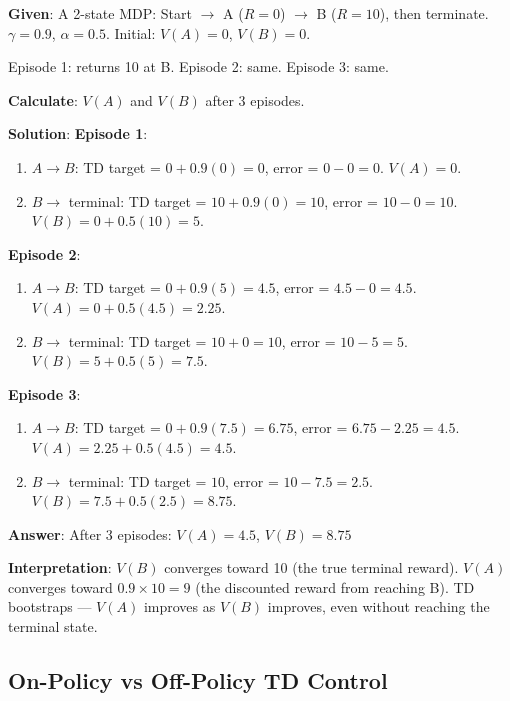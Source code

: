 \documentclass[11pt,a4paper]{article}
\begin{document}
\begin{tcolorbox}[colback=green!5!white,colframe=green!75!black,title=\textbf{Worked Example 33: TD(0) Over Multiple Episodes}]
\textbf{Given}: A 2-state MDP: Start $\to$ A ($R=0$) $\to$ B ($R=10$), then terminate. $\gamma = 0.9$, $\alpha = 0.5$. Initial: $V(A) = 0$, $V(B) = 0$.

Episode 1: returns 10 at B. Episode 2: same. Episode 3: same.

\textbf{Calculate}: $V(A)$ and $V(B)$ after 3 episodes.

\textbf{Solution}:
\textbf{Episode 1}:
\begin{enumerate}
    \item $A \to B$: TD target = $0 + 0.9(0) = 0$, error = $0 - 0 = 0$. $V(A) = 0$.
    \item $B \to$ terminal: TD target = $10 + 0.9(0) = 10$, error = $10 - 0 = 10$. $V(B) = 0 + 0.5(10) = 5$.
\end{enumerate}

\textbf{Episode 2}:
\begin{enumerate}
    \item $A \to B$: TD target = $0 + 0.9(5) = 4.5$, error = $4.5 - 0 = 4.5$. $V(A) = 0 + 0.5(4.5) = 2.25$.
    \item $B \to$ terminal: TD target = $10 + 0 = 10$, error = $10 - 5 = 5$. $V(B) = 5 + 0.5(5) = 7.5$.
\end{enumerate}

\textbf{Episode 3}:
\begin{enumerate}
    \item $A \to B$: TD target = $0 + 0.9(7.5) = 6.75$, error = $6.75 - 2.25 = 4.5$. $V(A) = 2.25 + 0.5(4.5) = 4.5$.
    \item $B \to$ terminal: TD target = $10$, error = $10 - 7.5 = 2.5$. $V(B) = 7.5 + 0.5(2.5) = 8.75$.
\end{enumerate}

\textbf{Answer}: After 3 episodes: $V(A) = 4.5$, $V(B) = 8.75$

\textbf{Interpretation}: $V(B)$ converges toward 10 (the true terminal reward). $V(A)$ converges toward $0.9 \times 10 = 9$ (the discounted reward from reaching B). TD bootstraps --- $V(A)$ improves as $V(B)$ improves, even without reaching the terminal state.
\end{tcolorbox}

\subsection{On-Policy vs Off-Policy TD Control}
\end{document}
